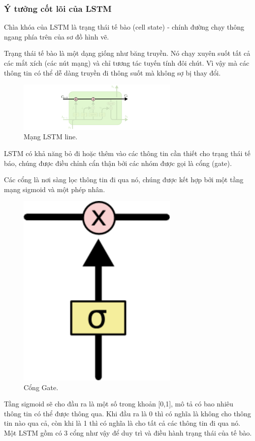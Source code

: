 \subsubsection{Ý tưởng cốt lõi của LSTM}
Chìa khóa của LSTM là trạng thái tế bào (cell state) - chính đường chạy thông ngang phía trên của sơ đồ hình vẽ.

Trạng thái tế bào là một dạng giống như băng truyền. Nó chạy xuyên suốt tất cả các mắt xích (các nút mạng) và chỉ tương tác tuyến tính đôi chút. Vì vậy mà các thông tin có thể dễ dàng truyền đi thông suốt mà không sợ bị thay đổi.

\begin{figure}[h!]
	\centering
	\includegraphics[width=0.7\textwidth]{Figures/LSTM3-C-line.png}
	\caption[Mạng LSTM line.]{Mạng LSTM line.}
	\label{fig:LSTM3-C-line.png} 
\end{figure}
LSTM có khả năng bỏ đi hoặc thêm vào các thông tin cần thiết cho trạng thái tế báo, chúng được điều chỉnh cẩn thận bởi các nhóm được gọi là cổng (gate).

Các cổng là nơi sàng lọc thông tin đi qua nó, chúng được kết hợp bởi một tầng mạng sigmoid và một phép nhân.

\begin{figure}[h!]
	\centering
	\includegraphics[width=0.7\textwidth]{Figures/LSTM3-gate.png}
	\caption[Cổng Gate.]{Cổng Gate.}
	\label{fig:LSTM3-gate.png} 
\end{figure}
Tầng sigmoid sẽ cho đầu ra là một số trong khoản [0,1], mô tả có bao nhiêu thông tin có thể được thông qua. Khi đầu ra là 0 thì có nghĩa là không cho thông tin nào qua cả, còn khi là 1 thì có nghĩa là cho tất cả các thông tin đi qua nó.
Một LSTM gồm có 3 cổng như vậy để duy trì và điều hành trạng thái của tế bào.
